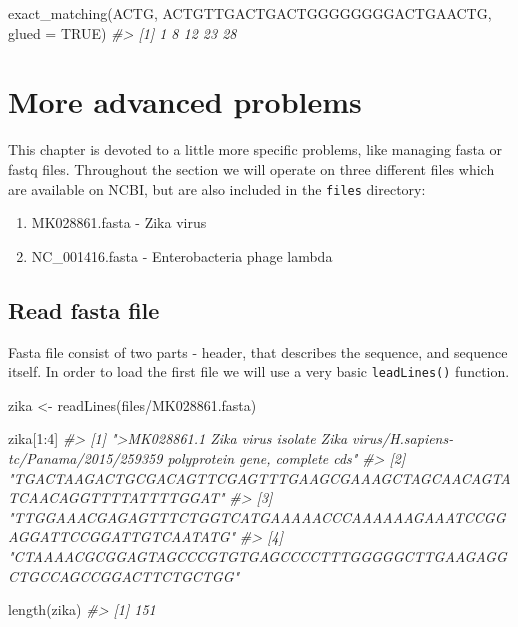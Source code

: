 \documentclass[
]{book}
\newenvironment{Shaded}{\begin{snugshade}}{\end{snugshade}}
\newcommand{\AttributeTok}[1]{\textcolor[rgb]{0.77,0.63,0.00}{#1}}
\newcommand{\CommentTok}[1]{\textcolor[rgb]{0.56,0.35,0.01}{\textit{#1}}}
\newcommand{\ConstantTok}[1]{\textcolor[rgb]{0.00,0.00,0.00}{#1}}
\newcommand{\DecValTok}[1]{\textcolor[rgb]{0.00,0.00,0.81}{#1}}
\newcommand{\FunctionTok}[1]{\textcolor[rgb]{0.00,0.00,0.00}{#1}}
\newcommand{\NormalTok}[1]{#1}
\newcommand{\OtherTok}[1]{\textcolor[rgb]{0.56,0.35,0.01}{#1}}
\newcommand{\SpecialCharTok}[1]{\textcolor[rgb]{0.00,0.00,0.00}{#1}}
\newcommand{\StringTok}[1]{\textcolor[rgb]{0.31,0.60,0.02}{#1}}
\begin{document}
\begin{Shaded}
\begin{Highlighting}[]
\FunctionTok{exact\_matching}\NormalTok{(}\StringTok{\textquotesingle{}ACTG\textquotesingle{}}\NormalTok{, }\StringTok{\textquotesingle{}ACTGTTGACTGACTGGGGGGGGACTGAACTG\textquotesingle{}}\NormalTok{, }\AttributeTok{glued =} \ConstantTok{TRUE}\NormalTok{)}
\CommentTok{\#\textgreater{} [1]  1  8 12 23 28}
\end{Highlighting}
\end{Shaded}

\hypertarget{advanced}{%
\chapter{More advanced problems}\label{advanced}}

This chapter is devoted to a little more specific problems, like managing fasta or fastq files. Throughout the section we will operate on three different files which are available on NCBI, but are also included in the \texttt{files} directory:

\begin{enumerate}
\def\labelenumi{\arabic{enumi}.}
\item
  MK028861.fasta - Zika virus
\item
  NC\_001416.fasta - Enterobacteria phage lambda
\end{enumerate}

\hypertarget{read-fasta-file}{%
\section{Read fasta file}\label{read-fasta-file}}

Fasta file consist of two parts - header, that describes the sequence, and sequence itself. In order to load the first file we will use a very basic \texttt{leadLines()} function.

\begin{Shaded}
\begin{Highlighting}[]
\NormalTok{zika }\OtherTok{\textless{}{-}} \FunctionTok{readLines}\NormalTok{(}\StringTok{\textquotesingle{}files/MK028861.fasta\textquotesingle{}}\NormalTok{)}

\NormalTok{zika[}\DecValTok{1}\SpecialCharTok{:}\DecValTok{4}\NormalTok{]}
\CommentTok{\#\textgreater{} [1] "\textgreater{}MK028861.1 Zika virus isolate Zika virus/H.sapiens{-}tc/Panama/2015/259359 polyprotein gene, complete cds"}
\CommentTok{\#\textgreater{} [2] "TGACTAAGACTGCGACAGTTCGAGTTTGAAGCGAAAGCTAGCAACAGTATCAACAGGTTTTATTTTGGAT"                                  }
\CommentTok{\#\textgreater{} [3] "TTGGAAACGAGAGTTTCTGGTCATGAAAAACCCAAAAAAGAAATCCGGAGGATTCCGGATTGTCAATATG"                                  }
\CommentTok{\#\textgreater{} [4] "CTAAAACGCGGAGTAGCCCGTGTGAGCCCCTTTGGGGGCTTGAAGAGGCTGCCAGCCGGACTTCTGCTGG"}

\FunctionTok{length}\NormalTok{(zika)}
\CommentTok{\#\textgreater{} [1] 151}
\end{Highlighting}
\end{Shaded}
\end{document}
